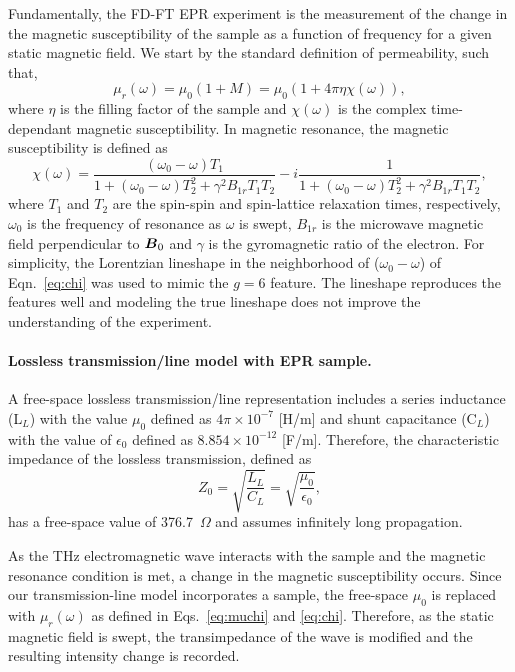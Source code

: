 Fundamentally, the FD-FT EPR experiment is the measurement of the change in the magnetic susceptibility of the sample as a function of frequency for a given static magnetic field. We start by the standard definition of permeability, such that, 
\begin{equation}
    \mu_r(\omega) = \mu_0 (1+M) = \mu_0 (1+ 4 \pi \eta \chi(\omega)),\label{eq:muchi}
\end{equation} 
where $\eta$ is the filling factor of the sample and $\chi(\omega)$ is the complex time-dependant magnetic susceptibility. In magnetic resonance, the magnetic susceptibility is defined as 
\begin{equation}
      \chi(\omega) = \frac{(\omega_0 - \omega) T_1 }{1+(\omega_0 - \omega)T_2^2+\gamma^2 B_{1r} T_1 T_2}- i \frac{1}{1+(\omega_0 - \omega)T_2^2+\gamma^2 B_{1r} T_1 T_2},  \label{eq:chi}
\end{equation}
where $T_1$ and $T_2$ are the spin-spin and spin-lattice relaxation times, respectively, $\omega_0$ is the frequency of resonance as $\omega$ is swept, $B_{1r}$ is the microwave magnetic field perpendicular to $\boldsymbol{B}_{0}$ and $\gamma$ is the gyromagnetic ratio of the electron. \cite{abragam1961} For simplicity, the Lorentzian lineshape in the neighborhood of ($\omega_0-\omega$) of Eqn.~\ref{eq:chi} was used to mimic the $g=6$ feature. The lineshape reproduces the features well and modeling the true lineshape does not improve the understanding of the experiment. 

\noindent \paragraph*{Lossless transmission\-/line model with EPR sample.} A free-space lossless transmission\-/line representation includes a series inductance (L$_L$) with the value $\mu_0$ defined as $4 \pi \times 10^{-7}$ [H/m] and shunt capacitance (C$_L$) with the value of $\epsilon_0$ defined as $8.854 \times 10^{-12}$ [F/m]. \cite{ramo1984fields} Therefore, the characteristic impedance of the lossless transmission, defined as
\begin{equation}
    Z_0 = \sqrt{\frac{L_L}{C_L}} = \sqrt{\frac{\mu_0}{\epsilon_0}},
\end{equation}
has a free-space value of 376.7~$\Omega$ and assumes infinitely long propagation. 

As the THz electromagnetic wave interacts with the sample and the magnetic resonance condition is met, a change in the magnetic susceptibility occurs. Since our transmission-line model incorporates a sample, the free-space $\mu_0$ is replaced with $\mu_r(\omega)$ as defined in Eqs.~\ref{eq:muchi} and \ref{eq:chi}. Therefore, as the static magnetic field is swept, the transimpedance of the wave is modified and the resulting intensity change is recorded.

